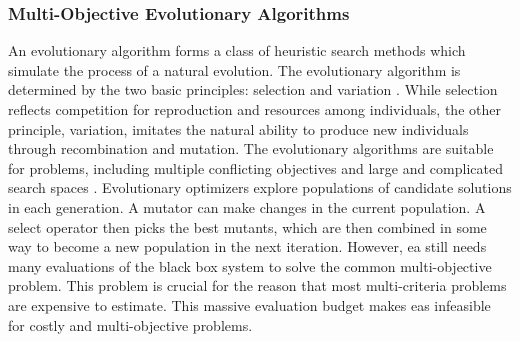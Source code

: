 

            \subsubsection{Multi-Objective Evolutionary Algorithms}
            An evolutionary algorithm forms a class of heuristic search methods which simulate the process of a natural evolution. The evolutionary algorithm is determined by the two basic principles: selection and variation \cite{TutMOEABrockhoff}. While selection reflects competition for reproduction and resources among individuals, the other principle, variation, imitates the natural ability to produce new individuals through recombination and mutation. 
            The evolutionary algorithms are suitable for problems, including multiple conflicting objectives and large and complicated search spaces \cite{Andersson00asurvey, RamirezRV19}. Evolutionary optimizers explore populations of candidate solutions in each generation. A mutator can make changes in the current population. A select operator then picks the best mutants, which are then combined in some way to become a new population in the next iteration. However, \gls{ea} still needs many evaluations of the black box system to solve the common multi-objective problem. This problem is crucial for the reason that most multi-criteria problems are expensive to estimate. This massive evaluation budget makes \gls{ea}s infeasible for costly and multi-objective problems.  


